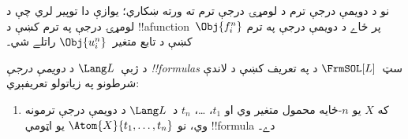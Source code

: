 \documentclass[../../../include/open-logic-section]{subfiles}
\begin{document}
\begin{explain}
نو د دويمې درجې ترم د لومړۍ درجې ترم ته ورته ښکاري؛ يوازې دا توپير
لري چې د لومړۍ درجې په ترم کښې د !!a{function}~$\Obj{f^n_i}$ پر
ځاے د دويمې درجې په ترم کښې د تابع متغير~$\Obj{u^n_i}$ راتلے شي۔
\end{explain}

\begin{defn}
د ژبې~$\Lang L$ د \emph{دويمې درجې !!{formula}s} سټ~$\FrmSOL[L]$
د  په تعريف کښې د لاندې شرطونو
په زياتولو تعريفېږي:
\begin{enumerate}
\item که $X$ يو $n$-ځايه محمول متغير وي او $t_1$، \dots، $t_n$
  د~$\Lang L$ د دويمې درجې ترمونه وي، نو
  $\Atom{X}{t_1,\ldots, t_n}$ يو اټومي !!{formula} دے۔




\end{enumerate}
\end{defn}
\end{document}
